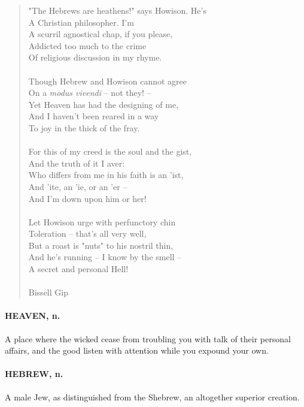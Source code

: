 \documentclass[11pt]{article}
\begin{document}
\begin{quote}   "The Hebrews are heathens!" says Howison.  He's \\
      A Christian philosopher.  I'm \\
  A scurril agnostical chap, if you please, \\
      Addicted too much to the crime \\
      Of religious discussion in my rhyme. \\
 \\
  Though Hebrew and Howison cannot agree \\
      On a {\em modus vivendi} -- not they! -- \\
  Yet Heaven has had the designing of me, \\
      And I haven't been reared in a way \\
      To joy in the thick of the fray. \\
 \\
  For this of my creed is the soul and the gist, \\
      And the truth of it I aver: \\
  Who differs from me in his faith is an 'ist, \\
      And 'ite, an 'ie, or an 'er -- \\
      And I'm down upon him or her! \\
 \\
  Let Howison urge with perfunctory chin \\
      Toleration -- that's all very well, \\
  But a roast is "nuts" to his nostril thin, \\
      And he's running -- I know by the smell -- \\
      A secret and personal Hell! \\
 \\
Bissell Gip \end{quote}


\paragraph{HEAVEN, n.}  A place where the wicked cease from troubling you with
talk of their personal affairs, and the good listen with attention
while you expound your own.

\paragraph{HEBREW, n.}  A male Jew, as distinguished from the Shebrew, an
altogether superior creation.
\end{document}
